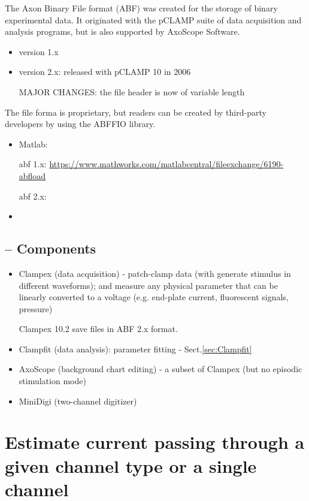The Axon Binary File format (ABF) was created for the storage of binary experimental data.
It originated with the pCLAMP suite of data acquisition and analysis programs, but is also
supported by AxoScope Software. 
\begin{itemize}
  \item version 1.x
  
  \item version 2.x: released with pCLAMP 10 in 2006
  
  MAJOR CHANGES: the file header is now of variable length
\end{itemize}

The file forma is proprietary, but readers can be created by third-party
developers by using the ABFFIO library.
\begin{itemize}
  \item Matlab: 
  
abf 1.x: \url{https://www.mathworks.com/matlabcentral/fileexchange/6190-abfload}

abf 2.x: 

  \item 
\end{itemize}


\subsection{-- Components}

\begin{itemize}
  
  \item  Clampex (data acquisition) - patch-clamp data (with generate stimulus
  in different waveforms); and measure any physical parameter that can be
  linearly converted to a voltage (e.g. end-plate current, fluorescent signals,
  pressure)

Clampex 10.2 save files in ABF 2.x format.

  \item Clampfit (data analysis): parameter fitting - Sect.\ref{sec:Clampfit}

  \item AxoScope (background chart editing) - a subset of Clampex (but no
  episodic stimulation mode)

  \item MiniDigi (two-channel digitizer)

\end{itemize}

\section{Estimate current passing through a given channel type or a single
channel}
\label{sec:transmembrane-current}

